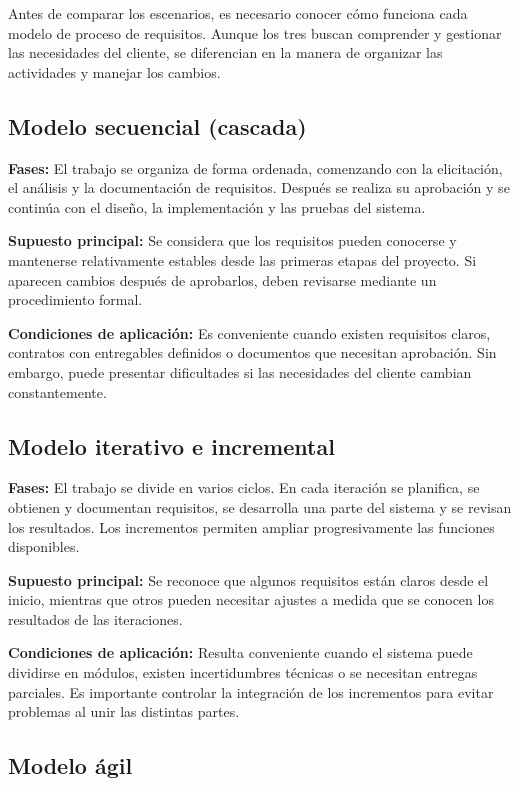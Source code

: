 \documentclass[12pt,a4paper]{article}
\begin{document}
Antes de comparar los escenarios, es necesario conocer cómo funciona cada modelo de proceso de requisitos. Aunque los tres buscan comprender y gestionar las necesidades del cliente, se diferencian en la manera de organizar las actividades y manejar los cambios.

\subsection{Modelo secuencial (cascada)}

\textbf{Fases:} El trabajo se organiza de forma ordenada, comenzando con la elicitación, el análisis y la documentación de requisitos. Después se realiza su aprobación y se continúa con el diseño, la implementación y las pruebas del sistema.

\textbf{Supuesto principal:} Se considera que los requisitos pueden conocerse y mantenerse relativamente estables desde las primeras etapas del proyecto. Si aparecen cambios después de aprobarlos, deben revisarse mediante un procedimiento formal.

\textbf{Condiciones de aplicación:} Es conveniente cuando existen requisitos claros, contratos con entregables definidos o documentos que necesitan aprobación. Sin embargo, puede presentar dificultades si las necesidades del cliente cambian constantemente.

\subsection{Modelo iterativo e incremental}

\textbf{Fases:} El trabajo se divide en varios ciclos. En cada iteración se planifica, se obtienen y documentan requisitos, se desarrolla una parte del sistema y se revisan los resultados. Los incrementos permiten ampliar progresivamente las funciones disponibles.

\textbf{Supuesto principal:} Se reconoce que algunos requisitos están claros desde el inicio, mientras que otros pueden necesitar ajustes a medida que se conocen los resultados de las iteraciones.

\textbf{Condiciones de aplicación:} Resulta conveniente cuando el sistema puede dividirse en módulos, existen incertidumbres técnicas o se necesitan entregas parciales. Es importante controlar la integración de los incrementos para evitar problemas al unir las distintas partes.

\subsection{Modelo ágil}
\end{document}
